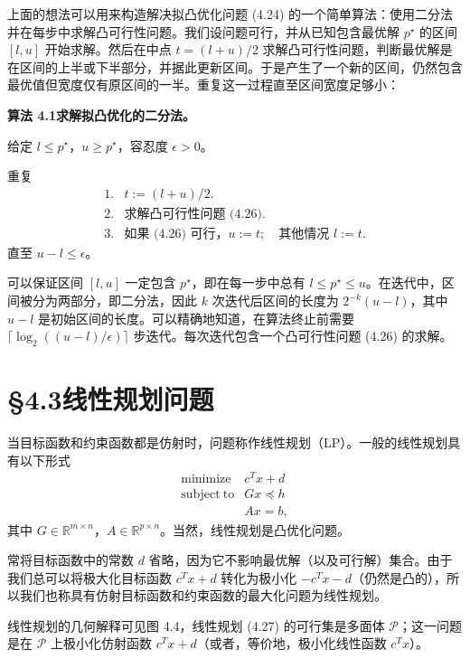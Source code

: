 \documentclass[UTF8, 12pt, fontset=fandol, oneside]{ctexart}
\begin{document}
上面的想法可以用来构造解决拟凸优化问题 (4.24) 的一个简单算法：使用二分法并在每步中求解凸可行性问题。我们设问题可行，并从已知包含最优解 $p^\star$ 的区间 $[l,u]$ 开始求解。然后在中点 $t=(l+u)/2$ 求解凸可行性问题，判断最优解是在区间的上半或下半部分，并据此更新区间。于是产生了一个新的区间，仍然包含最优值但宽度仅有原区间的一半。重复这一过程直至区间宽度足够小：

\noindent\textbf{算法 4.1\quad 求解拟凸优化的二分法。}

给定 $l\leq p^\star$，$u\geq p^\star$，容忍度 $\epsilon>0$。

重复
\[
\begin{array}{ll}
1. & t:=(l+u)/2.\\
2. & \text{求解凸可行性问题 (4.26).}\\
3. & \text{如果 (4.26) 可行，}u:=t;\quad \text{其他情况 }l:=t.
\end{array}
\]
直至 $u-l\leq\epsilon$。

可以保证区间 $[l,u]$ 一定包含 $p^\star$，即在每一步中总有 $l\leq p^\star\leq u$。在迭代中，区间被分为两部分，即二分法，因此 $k$ 次迭代后区间的长度为 $2^{-k}(u-l)$，其中 $u-l$ 是初始区间的长度。可以精确地知道，在算法终止前需要 $\lceil\log_2((u-l)/\epsilon)\rceil$ 步迭代。每次迭代包含一个凸可行性问题 (4.26) 的求解。

\section*{§4.3\quad 线性规划问题}

当目标函数和约束函数都是仿射时，问题称作线性规划（LP）。一般的线性规划具有以下形式
\begin{equation}
\begin{array}{ll}
\mathop{\mathrm{minimize}} & c^Tx+d\\
\mathrm{subject\ to} & Gx\preceq h\\
& Ax=b,
\end{array}
\tag{4.27}
\end{equation}
其中 $G\in\mathbb{R}^{m\times n}$，$A\in\mathbb{R}^{p\times n}$。当然，线性规划是凸优化问题。

常将目标函数中的常数 $d$ 省略，因为它不影响最优解（以及可行解）集合。由于我们总可以将极大化目标函数 $c^Tx+d$ 转化为极小化 $-c^Tx-d$（仍然是凸的），所以我们也称具有仿射目标函数和约束函数的最大化问题为线性规划。

线性规划的几何解释可见图 4.4，线性规划 (4.27) 的可行集是多面体 $\mathcal{P}$；这一问题是在 $\mathcal{P}$ 上极小化仿射函数 $c^Tx+d$（或者，等价地，极小化线性函数 $c^Tx$）。
\end{document}
